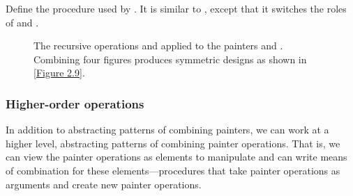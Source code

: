 \begin{exercise}
	\label{Exercise 2.44}
	Define the procedure  used by .
	It is similar to , except that it switches the roles of  and .
\end{exercise}



\begin{figure}[tbp]
	\centering
	
	\caption{
		The recursive operations  and  applied to the painters  and .
		Combining four  figures produces symmetric  designs as shown in \cref{Figure 2.9}.
	}
	\label{Figure 2.14}
\end{figure}



\subsubsection*{Higher-order operations}

In addition to abstracting patterns of combining painters, we can work at a higher level, abstracting patterns of combining painter operations.
That is, we can view the painter operations as elements to manipulate and can write means of combination for these elements---procedures that take painter operations as arguments and create new painter operations.

